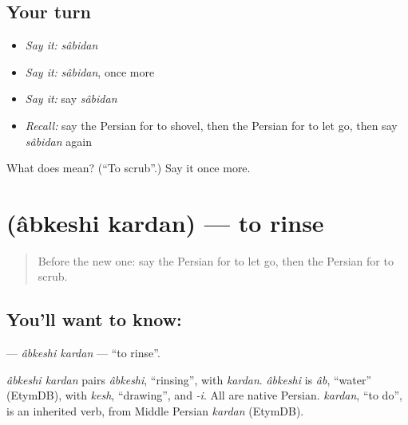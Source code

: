 \subsection*{Your turn}
\begin{itemize}
\raggedright
  \item \emph{Say it:} \emph{sâbidan}
  \item \emph{Say it:} \emph{sâbidan}, once more
  \item \emph{Say it:} say \emph{sâbidan}
  \item \emph{Recall:} say the Persian for to shovel, then the Persian for to let go, then say \emph{sâbidan} again
\end{itemize}

\begin{tcolorbox}[breakable,colback=teal!4,colframe=teal!35!black,title={Before you move on}]
What does  mean? (\textquotedblleft{}To scrub\textquotedblright{}.) Say it once more.
\end{tcolorbox}
\section[\texorpdfstring{\fa{آبکشی} \fa{کردن} (âbkeshi kardan)}{آبکشی کردن (âbkeshi kardan)}]{  (âbkeshi kardan) — to rinse}

\label{lesson:FA-C226-abkeshi-kardan}



\begin{quote}
Before the new one: say the Persian for to let go, then the Persian for to scrub.
\end{quote}

\subsection*{You'll want to know:  }
\textbf{ } — \emph{âbkeshi kardan} — \textquotedblleft{}to rinse\textquotedblright{}.

\begin{cousinweb}
\emph{âbkeshi kardan} pairs \emph{âbkeshi}, \textquotedblleft{}rinsing\textquotedblright{}, with \emph{kardan}. \emph{âbkeshi} is \emph{âb}, \textquotedblleft{}water\textquotedblright{} (EtymDB), with \emph{kesh}, \textquotedblleft{}drawing\textquotedblright{}, and \emph{-i}. All are native Persian. \emph{kardan}, \textquotedblleft{}to do\textquotedblright{}, is an inherited verb, from Middle Persian \emph{kardan} (EtymDB).
\end{cousinweb}

